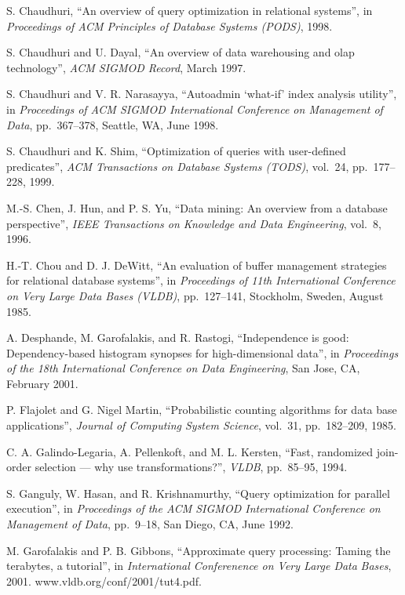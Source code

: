 \documentclass[b5paper,11pt,twoside,openright]{book}
\begin{document}
\begin{enumerate}[label={[\arabic*]}]
  S. Chaudhuri, ``An overview of query optimization in relational
  systems'', in \emph{Proceedings of ACM Principles of Database Systems (PODS)}, 1998.
\item
  S. Chaudhuri and U. Dayal, ``An overview of data warehousing and olap
  technology'', \emph{ACM SIGMOD Record}, March 1997.
\item
  S. Chaudhuri and V. R. Narasayya, ``Autoadmin `what-if' index analysis
  utility'', in \emph{Proceedings of ACM SIGMOD International Conference
  on Management of Data}, pp.~367--378, Seattle, WA, June 1998.
\item
  S. Chaudhuri and K. Shim, ``Optimization of queries with user-defined
  predicates'', \emph{ACM Transactions on Database Systems (TODS)},
  vol.~24, pp.~177--228, 1999.
\item
  M.-S. Chen, J. Hun, and P. S. Yu, ``Data mining: An overview from a
  database perspective'', \emph{IEEE Transactions on Knowledge and Data
  Engineering}, vol.~8, 1996.
\item
  H.-T. Chou and D. J. DeWitt, ``An evaluation of buffer management
  strategies for relational database systems'', in \emph{Proceedings of
  11th International Conference on Very Large Data Bases (VLDB)},
  pp.~127--141, Stockholm, Sweden, August 1985.
\item
  A. Desphande, M. Garofalakis, and R. Rastogi, ``Independence is good:
  Dependency-based histogram synopses for high-dimensional data'', in
  \emph{Proceedings of the 18th International Conference on Data
  Engineering}, San Jose, CA, February 2001.
\item
  P. Flajolet and G. Nigel Martin, ``Probabilistic counting algorithms
  for data base applications'', \emph{Journal of Computing System
  Science}, vol.~31, pp.~182--209, 1985.
\item
  C. A. Galindo-Legaria, A. Pellenkoft, and M. L. Kersten, ``Fast,
  randomized join-order selection --- why use transformations?'',
  \emph{VLDB}, pp.~85--95, 1994.
\item
  S. Ganguly, W. Hasan, and R. Krishnamurthy, ``Query optimization for
  parallel execution'', in \emph{Proceedings of the ACM SIGMOD
  International Conference on} \emph{Management of Data}, pp.~9--18, San
  Diego, CA, June 1992.
\item
  M. Garofalakis and P. B. Gibbons, ``Approximate query processing:
  Taming the terabytes, a tutorial'', in \emph{International
  Conferenence on Very Large Data} \emph{Bases}, 2001.
  www.vldb.org/conf/2001/tut4.pdf.
\item

\end{enumerate}
\end{document}
